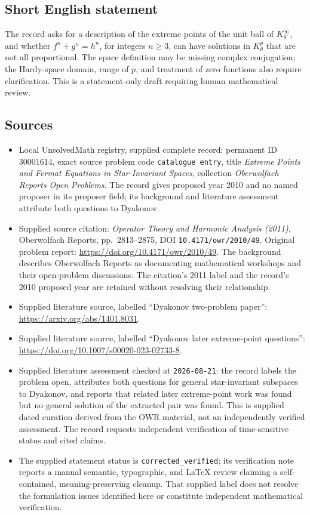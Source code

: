 \documentclass[11pt]{article}
\begin{document}
\subsection{Short English statement}
The record asks for a description of the extreme points of the unit ball of \(K^\infty_\theta\), and whether \(f^n+g^n=h^n\), for integers \(n\geq3\), can have solutions in \(K^p_\theta\) that are not all proportional. The space definition may be missing complex conjugation; the Hardy-space domain, range of \(p\), and treatment of zero functions also require clarification. This is a statement-only draft requiring human mathematical review.
\subsection{Sources}
\begin{itemize}
\item Local UnsolvedMath registry, supplied complete record: permanent ID \(30001614\), exact source problem code \texttt{catalogue entry}, title \emph{Extreme Points and Fermat Equations in Star-Invariant Spaces}, collection \emph{Oberwolfach Reports Open Problems}. The record gives proposed year 2010 and no named proposer in its proposer field; its background and literature assessment attribute both questions to Dyakonov.
\item Supplied source citation: \emph{Operator Theory and Harmonic Analysis (2011)}, Oberwolfach Reports, pp.\ 2813--2875, DOI \texttt{10.4171/owr/2010/49}. Original problem report: \url{https://doi.org/10.4171/owr/2010/49}. The background describes Oberwolfach Reports as documenting mathematical workshops and their open-problem discussions. The citation's 2011 label and the record's 2010 proposed year are retained without resolving their relationship.
\item Supplied literature source, labelled ``Dyakonov two-problem paper'': \url{https://arxiv.org/abs/1401.8031}.
\item Supplied literature source, labelled ``Dyakonov later extreme-point questions'': \url{https://doi.org/10.1007/s00020-023-02733-8}.
\item Supplied literature assessment checked at \texttt{2026-08-21}: the record labels the problem open, attributes both questions for general star-invariant subspaces to Dyakonov, and reports that related later extreme-point work was found but no general solution of the extracted pair was found. This is supplied dated curation derived from the OWR material, not an independently verified assessment. The record requests independent verification of time-sensitive status and cited claims.
\item The supplied statement status is \texttt{corrected\_verified}; its verification note reports a manual semantic, typographic, and LaTeX review claiming a self-contained, meaning-preserving cleanup. That supplied label does not resolve the formulation issues identified here or constitute independent mathematical verification.
\end{itemize}
\end{document}

